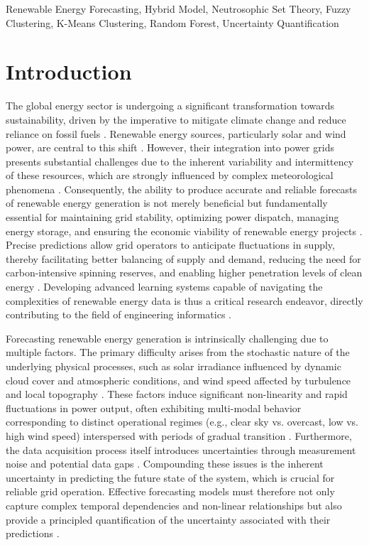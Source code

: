 \documentclass[review,3p,times]{elsarticle}
\begin{document}
\begin{frontmatter}
\begin{keyword}
Renewable Energy Forecasting\sep
Hybrid Model\sep
Neutrosophic Set Theory\sep
Fuzzy Clustering\sep
K-Means Clustering\sep
Random Forest\sep
Uncertainty Quantification
\end{keyword}

\end{frontmatter}

\linenumbers
\section{Introduction}
\label{sec:intr}
The global energy sector is undergoing a significant transformation towards sustainability, driven by the imperative to mitigate climate change and reduce reliance on fossil fuels \cite{sorensen2023recent}. Renewable energy sources, particularly solar and wind power, are central to this shift \cite{hong2020energy}. However, their integration into power grids presents substantial challenges due to the inherent variability and intermittency of these resources, which are strongly influenced by complex meteorological phenomena \cite{iung2023review}. Consequently, the ability to produce accurate and reliable forecasts of renewable energy generation is not merely beneficial but fundamentally essential for maintaining grid stability, optimizing power dispatch, managing energy storage, and ensuring the economic viability of renewable energy projects \cite{basmadjian2023assessing, pierro2022impact}. Precise predictions allow grid operators to anticipate fluctuations in supply, thereby facilitating better balancing of supply and demand, reducing the need for carbon-intensive spinning reserves, and enabling higher penetration levels of clean energy \cite{hong2020energy}. Developing advanced learning systems capable of navigating the complexities of renewable energy data is thus a critical research endeavor, directly contributing to the field of engineering informatics \cite{xu2024copula, zheng2024interpretable}. \aiInline


Forecasting renewable energy generation is intrinsically challenging due to multiple factors. The primary difficulty arises from the stochastic nature of the underlying physical processes, such as solar irradiance influenced by dynamic cloud cover and atmospheric conditions, and wind speed affected by turbulence and local topography \cite{sorensen2023recent, hong2020energy}. These factors induce significant non-linearity and rapid fluctuations in power output, often exhibiting multi-modal behavior corresponding to distinct operational regimes (e.g., clear sky vs. overcast, low vs. high wind speed) interspersed with periods of gradual transition \cite{iung2023review}. Furthermore, the data acquisition process itself introduces uncertainties through measurement noise and potential data gaps \cite{benti2023forecasting}. Compounding these issues is the inherent uncertainty in predicting the future state of the system, which is crucial for reliable grid operation. Effective forecasting models must therefore not only capture complex temporal dependencies and non-linear relationships but also provide a principled quantification of the uncertainty associated with their predictions \cite{safaei2023adaptation}.
\end{document}
